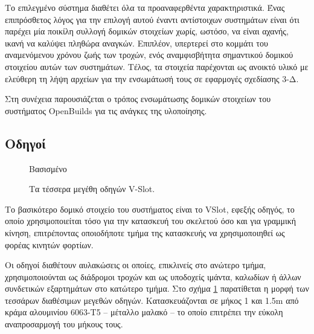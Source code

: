 
Το επιλεγμένο σύστημα διαθέτει όλα τα προαναφερθέντα χαρακτηριστικά. Ένας
επιπρόσθετος λόγος για την επιλογή αυτού έναντι αντίστοιχων συστημάτων είναι
ότι παρέχει μία ποικίλη συλλογή δομικών στοιχείων χωρίς, ωστόσο, να είναι
αχανής, ικανή να καλύψει πληθώρα αναγκών. Επιπλέον, υπερτερεί στο κομμάτι του
αναμενόμενου χρόνου ζωής των τροχών, ενός αναμφισβήτητα σημαντικού δομικού
στοιχείου αυτών των συστημάτων. Τέλος, τα στοιχεία παρέχονται ως ανοικτό υλικό
με ελεύθερη τη λήψη αρχείων για την ενσωμάτωσή τους σε εφαρμογές σχεδίασης 3-Δ.


Στη συνέχεια παρουσιάζεται ο τρόπος ενσωμάτωσης δομικών στοιχείων του συστήματος
OpenBuilds για τις ανάγκες της υλοποίησης.


\subsection{Οδηγοί}

\begin{figure}
    \caption{Τα τέσσερα μεγέθη οδηγών V-Slot.
    \label{fig:construct:vslot}}
    \begin{center}%
    \def\svgwidth{0.8\textwidth}
    
    \end{center}

    Βασισμένο 
\end{figure}

Το βασικότερο δομικό στοιχείο του συστήματος είναι το VSlot, εφεξής οδηγός, το
οποίο
χρησιμοποιείται τόσο για την κατασκευή του σκελετού όσο και για γραμμική κίνηση,
επιτρέποντας οποιοδήποτε τμήμα της κατασκευής να χρησιμοποιηθεί ως φορέας
κινητών φορτίων.

Οι οδηγοί διαθέτουν αυλακώσεις οι οποίες, επικλινείς στο ανώτερο τμήμα,
χρησιμοποιούνται ως διάδρομοι τροχών και ως υποδοχείς ιμάντα, καλωδίων ή άλλων
συνδετικών εξαρτημάτων στο κατώτερο τμήμα.
Στο σχήμα \ref{fig:construct:vslot} παρατίθεται η μορφή των τεσσάρων διαθέσιμων
μεγεθών οδηγών.
Κατασκευάζονται σε μήκος 1 και 1.5m από κράμα αλουμινίου 6063-T5 -- μέταλλο
μαλακό -- το οποίο επιτρέπει την εύκολη αναπροσαρμογή του μήκους τους.


